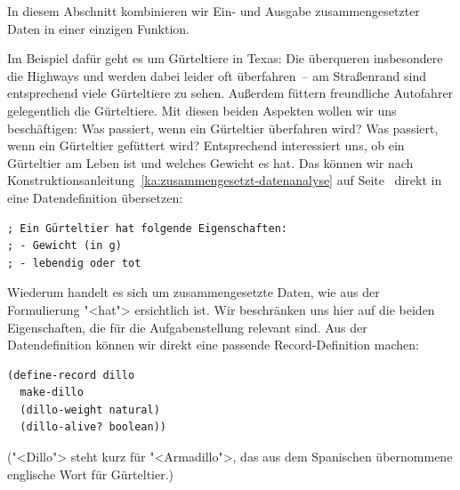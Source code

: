 %
In diesem Abschnitt kombinieren wir Ein- und
Ausgabe zusammengesetzter Daten in einer einzigen Funktion.

Im Beispiel dafür geht es um Gürteltiere in Texas:
Die überqueren insbesondere die Highways
und werden dabei leider oft überfahren~-- am Straßenrand
sind entsprechend viele Gürteltiere zu sehen.  Außerdem füttern
freundliche Autofahrer gelegentlich die Gürteltiere.  Mit diesen
beiden Aspekten wollen wir uns beschäftigen: Was passiert, wenn ein
Gürteltier überfahren wird?  Was passiert, wenn ein Gürteltier
gefüttert wird?  Entsprechend interessiert uns, ob ein Gürteltier am
Leben ist und welches Gewicht es hat.  Das können wir nach
Konstruktionsanleitung~\ref{ka:zusammengesetzt-datenanalyse} auf
Seite~\pageref{ka:zusammengesetzt-datenanalyse} direkt in eine
Datendefinition übersetzen:
%
\begin{lstlisting}
; Ein Gürteltier hat folgende Eigenschaften:
; - Gewicht (in g)
; - lebendig oder tot
\end{lstlisting}
%
Wiederum handelt es sich um zusammengesetzte Daten, wie
aus der Formulierung "<hat"> ersichtlich ist.  Wir beschränken uns
hier auf die beiden Eigenschaften, die für die Aufgabenstellung
relevant sind.
Aus der Datendefinition können wir direkt eine passende
Record-Definition machen:
% 
\begin{lstlisting}
(define-record dillo
  make-dillo
  (dillo-weight natural)
  (dillo-alive? boolean))
\end{lstlisting}
%
("<Dillo"> steht kurz für "<Armadillo">, das aus dem Spanischen
übernommene englische Wort für Gürteltier.)

